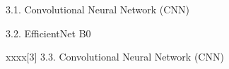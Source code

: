 3.1. Convolutional Neural Network (CNN)


3.2. EfficientNet B0

xxxx[3]
3.3. Convolutional Neural Network (CNN)
